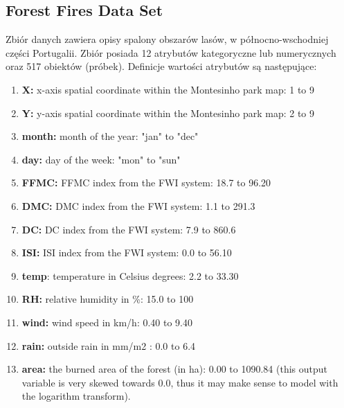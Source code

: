 \documentclass[10pt,a4paper]{article}
\begin{document}
\subsection{Forest Fires Data Set}
Zbiór danych zawiera opisy spalony obszarów lasów, w północno-wschodniej części Portugalii. Zbiór posiada 12 atrybutów kategoryczne lub numerycznych oraz 517 obiektów (próbek). Definicje wartości atrybutów są następujące:
\begin{enumerate}
	\item \textbf{X:} x-axis spatial coordinate within the Montesinho park map: 1 to 9
	\item \textbf{Y:} y-axis spatial coordinate within the Montesinho park map: 2 to 9
	\item \textbf{month:} month of the year: "jan" to "dec" 
	\item \textbf{day:} day of the week: "mon" to "sun"
	\item \textbf{FFMC:} FFMC index from the FWI system: 18.7 to 96.20
	\item \textbf{DMC:} DMC index from the FWI system: 1.1 to 291.3 
	\item \textbf{DC:} DC index from the FWI system: 7.9 to 860.6 
	\item \textbf{ISI:} ISI index from the FWI system: 0.0 to 56.10
	\item \textbf{temp}: temperature in Celsius degrees: 2.2 to 33.30
	\item \textbf{RH:} relative humidity in \%: 15.0 to 100
	\item \textbf{wind:} wind speed in km/h: 0.40 to 9.40 
	\item \textbf{rain:} outside rain in mm/m2 : 0.0 to 6.4 
	\item \textbf{area:} the burned area of the forest (in ha): 0.00 to 1090.84 
(this output variable is very skewed towards 0.0, thus it may make sense to model with the logarithm transform).  
\end{enumerate}
\end{document}
